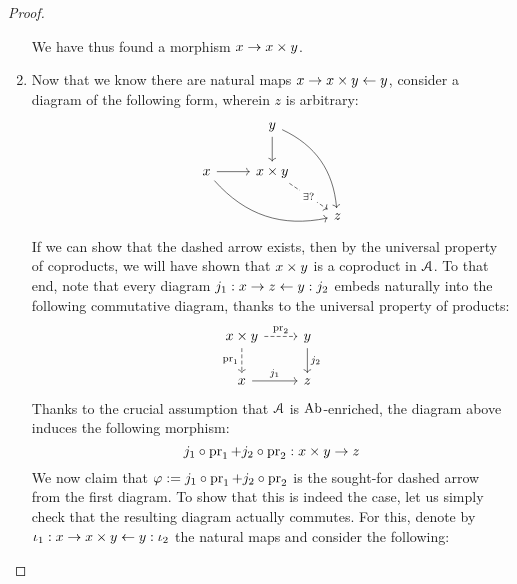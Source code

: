\begin{proof}
\begin{enumerate}
                                    We have thus found a morphism  $x \to x \x y$.
                                    \item Now that we know there are natural maps $x \to x \x y \ot y$, consider a diagram of the following form, wherein $z$ is arbitrary:
                                        $$
                                            \begin{tikzcd}
                                                                                                        & y \arrow[d] \arrow[rdd, bend left] &   \\
                                                x \arrow[r] \arrow[rrd, bend right] & x \x y \arrow[rd, "\exists ?" description, dashed]   &   \\
                                                                                                        &                                                      & z
                                            \end{tikzcd}
                                        $$
                                    If we can show that the dashed arrow exists, then by the universal property of coproducts, we will have shown that $x \x y$ is a coproduct in $\mathcal{A}$. To that end, note that every diagram $j_1: x \to z \leftarrow y: j_2$ embeds naturally into the following commutative diagram, thanks to the universal property of products:
                                        $$
                                            \begin{tikzcd}
                                                x \x y \arrow[d, "\pr_1"', dashed] \arrow[r, "\pr_2", dashed] & y \arrow[d, "j_2"] \\
                                                x \arrow[r, "j_1"]                                            & z                 
                                            \end{tikzcd}
                                        $$
                                    Thanks to the crucial assumption that $\mathcal{A}$ is $\mathrm{Ab}$-enriched, the diagram above induces the following morphism:
                                        $$j_1 \circ \pr_1 + j_2 \circ \pr_2: x \x y \to z$$
                                    We now claim that $\varphi := j_1 \circ \operatorname{pr}_1 + j_2 \circ \operatorname{pr}_2$ is the sought-for dashed arrow from the first diagram. To show that this is indeed the case, let us simply check that the resulting diagram actually commutes. For this, denote by $\iota_1: x \to x \x y \ot y: \iota_2$ the natural maps and consider the following:

\end{enumerate}
\end{proof}
